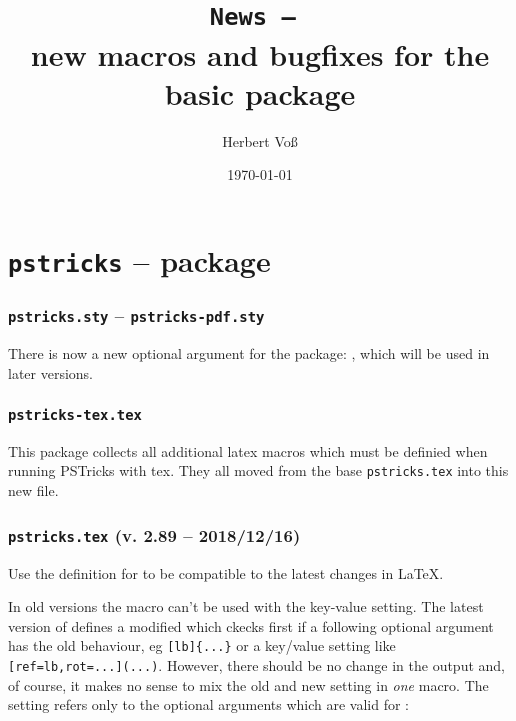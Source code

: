 \documentclass[11pt,english,BCOR=10mm,DIV=12,bibliography=totoc,parskip=false,headings=small,
    headinclude=false,footinclude=false,twoside]{pst-doc}
\let\Lfile\LFile
\begin{document}
\title{\texttt{News -- \the\year}\\ \Large new macros and bugfixes for the
basic package }
\author{Herbert Voß}
\date{\today}

\maketitle

\clearpage
\tableofcontents

\clearpage
\part{\texttt{pstricks} -- package}

\section{\texttt{pstricks.sty} -- \texttt{pstricks-pdf.sty}}

There is now a new optional argument for the package: , which will
be used in later versions. 
 
\section{\texttt{pstricks-tex.tex}}
This package collects all additional latex macros which must be definied
when running PSTricks with tex.  They all moved from the base \texttt{pstricks.tex} into
this new file.


\section{\texttt{pstricks.tex} (v. 2.89 -- 2018/12/16)}

Use the  definition for  to be compatible to the latest
changes in \LaTeX.

In old versions the macro  can't be used with the key-value setting. The latest version
of \Lfile{pstricks.tex} defines a modified  which ckecks first if a following
optional argument has the old behaviour, eg \texttt{[lb]\{...\}} or 
a key/value setting like \texttt{[ref=lb,rot=...](...)}. However, there should be no
change in the output and, of course, it makes no sense to mix the old and new setting in \emph{one}
 macro. The setting refers only to the optional arguments which are valid for :
\end{document}
